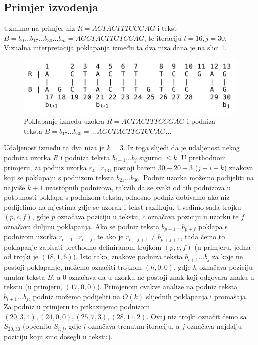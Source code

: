 \documentclass[times, utf8, zavrsni]{fer}
\begin{document}
\subsection{Primjer izvođenja} \label{primjer}
\begin{sloppypar}
Uzmimo na primjer niz $R = ACTACTTTCCGAG$ i tekst $B = b_{0}\dots b_{17}\dots b_{30} \dots b_{m} = AGCTACTTGTCCAG$, te iteraciju $l=16, j=30$. Vizualna interpretacija poklapanja između ta dva niza dana je na slici \ref{fig:infixExample}.
\end{sloppypar}
\begin{figure}[ht!]
\centering
\includegraphics[width=120mm]{InfixExample.jpeg}
\caption{Poklapanje između uzokra $R = ACTACTTTCCGAG$ i podniza teksta $B = b_{17}\dots b_{30} = \dots AGCTACTTGTCCAG \dots$}\label{fig:infixExample}
\end{figure}

Udaljenost između ta dva niza je $k=3$. Iz toga slijedi da je udaljenost nekog podniza uzorka $R$ i podniza teksta $b_{i+1}\dots b_{j}$ sigurno $\leq k$. U prethodnom primjeru, za podniz uzorka $r_{4}\dots r_{13}$, postoji barem $30-20-3$ ($j-i-k$) znakova koji se poklapaju s podnizom teksta $b_{21}\dots b_{30}$. Podniz uzorka možemo podijeliti na najviše $k+1$ uzastopnih podnizova, takvih da se svaki od tih podnizova u potpunosti poklapa s podnizom teksta, odnosno podniz dobivamo ako niz podijelimo na mjestima gdje se uzorak i tekst razlikuju. Uvedimo sada trojku $(p,c,f)$, gdje $p$ označava poziciju u tekstu, $c$ označava poziciju u uzorku te $f$ označava duljinu poklapanja. Ako se podniz teksta $b_{p+1}\dots b_{p+f}$ poklapa s podnizom uzorka $r_{c+1}\dots r_{c+f}$, te ako je $r_{c+f+1}\neq b_{p+f+1}$, tada ćemo to poklapanje zapisati prethodno definiranom trojkom $(p,c,f)$ (u primjeru, jedna od trojki je $(18,1,6)$). Isto tako, znakove podniza teksta $b_{i+1}\dots b_{j}$ za koje ne postoji poklapanje, možemo označiti trojkom $(h,0,0)$, gdje $h$ označava poziciju unutar teksta $B$, a $0$ označava da u uzorku ne postoji znak koji odgovara znaku u tekstu (u primjeru, $(17,0,0)$). Primjenom ovakve analize na podniz teksta $b_{i+1}\dots b_{j}$, podniz možemo podijeliti na $O(k)$ slijednih poklapanja i promašaja. Za podniz u primjeru to prikazujemo podnizom $(20,3,4),(24,0,0),(25,7,3),(28,11,2)$. Ovaj niz trojki označit ćemo sa $S_{20,30}$ (općenito $S_{i,j}$, gdje $i$ označava trenutnu iteraciju, a $j$ označava najdalju poziciju koju smo dosegli u tekstu).
\end{document}
